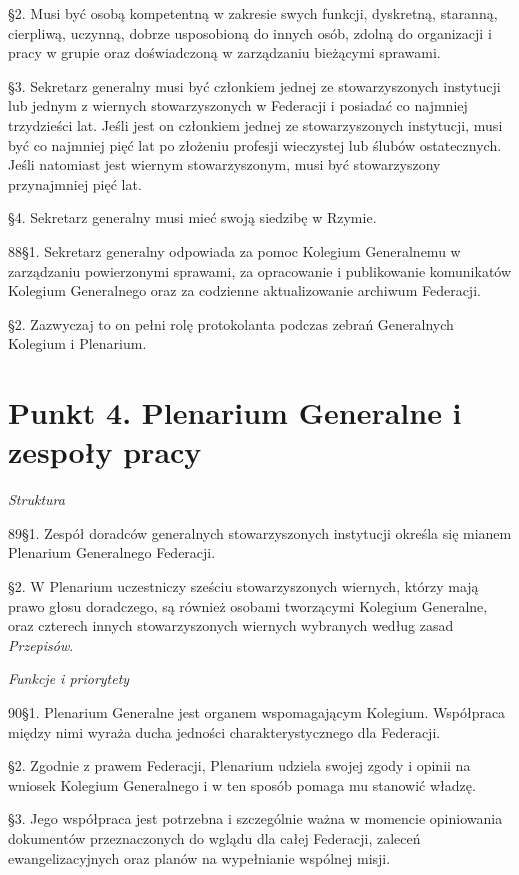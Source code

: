 ﻿\documentclass{book}
\newcommand{\lett}[1]{\lettrine[findent=6pt]{#1}}
\newcommand{\ssec}[1]{\vspace{1em}\textit{#1}\vspace{.5em}\nopagebreak}
\begin{document}
\S{}2. Musi być osobą kompetentną w zakresie swych funkcji, dyskretną, staranną, cierpliwą, uczynną, dobrze usposobioną do innych osób, zdolną do organizacji i pracy w grupie oraz doświadczoną w zarządzaniu bieżącymi sprawami.


\S{}3. Sekretarz generalny musi być członkiem jednej ze stowarzyszonych instytucji lub jednym z wiernych stowarzyszonych w Federacji i posiadać co najmniej trzydzieści lat. Jeśli jest on członkiem jednej ze stowarzyszonych instytucji, musi być co najmniej pięć lat po złożeniu profesji wieczystej lub ślubów ostatecznych. Jeśli natomiast jest wiernym stowarzyszonym, musi być stowarzyszony przynajmniej pięć lat.


\S{}4. Sekretarz generalny musi mieć swoją siedzibę w Rzymie.


\lett{88} \S{}1. Sekretarz generalny odpowiada za pomoc Kolegium Generalnemu w zarządzaniu powierzonymi sprawami, za opracowanie i publikowanie komunikatów Kolegium Generalnego oraz za codzienne aktualizowanie archiwum Federacji.


\S{}2. Zazwyczaj to on pełni rolę protokolanta podczas zebrań Generalnych Kolegium i Plenarium.


\section{Punkt 4. Plenarium Generalne i zespoły pracy}


\ssec{Struktura}


\lett{89} \S{}1. Zespół doradców generalnych stowarzyszonych instytucji określa się mianem Plenarium Generalnego Federacji.


\S{}2. W Plenarium uczestniczy sześciu stowarzyszonych wiernych, którzy mają prawo głosu doradczego, są również osobami tworzącymi Kolegium Generalne, oraz czterech innych stowarzyszonych wiernych wybranych według zasad {\em Przepisów}.


\ssec{Funkcje i priorytety}


\lett{90} \S{}1. Plenarium Generalne jest organem wspomagającym Kolegium. Współpraca między nimi wyraża ducha jedności charakterystycznego dla Federacji.


\S{}2. Zgodnie z prawem Federacji, Plenarium udziela swojej zgody i opinii na wniosek Kolegium Generalnego i w ten sposób pomaga mu stanowić władzę.


\S{}3. Jego współpraca jest potrzebna i szczególnie ważna w momencie opiniowania dokumentów przeznaczonych do wglądu dla całej Federacji, zaleceń ewangelizacyjnych oraz planów na wypełnianie wspólnej misji.
 
\end{document}
